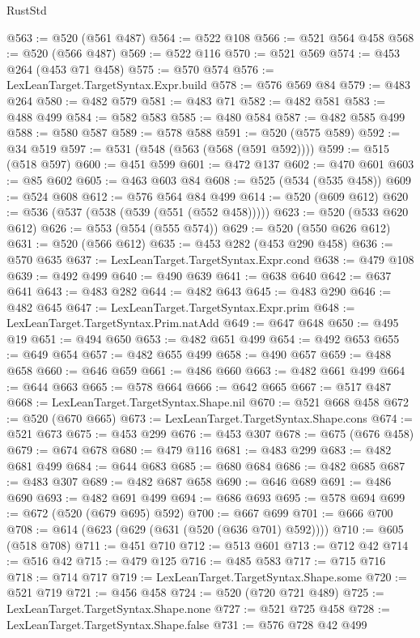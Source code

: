 \begin{lexlean}{RustStd}
\begin{coremodule}
{\begin{coremodule}
{{{{{{{{{{@563 := @520 (@561 @487)
@564 := @522 @108
@566 := @521 @564 @458
@568 := @520 (@566 @487)
@569 := @522 @116
@570 := @521 @569
@574 := @453 @264 (@453 @71 @458)
@575 := @570 @574
@576 := LexLeanTarget.TargetSyntax.Expr.build
@578 := @576 @569 @84
@579 := @483 @264
@580 := @482 @579
@581 := @483 @71
@582 := @482 @581
@583 := @488 @499
@584 := @582 @583
@585 := @480 @584
@587 := @482 @585 @499
@588 := @580 @587
@589 := @578 @588
@591 := @520 (@575 @589)
@592 := @34 @519
@597 := @531 (@548 (@563 (@568 (@591 @592))))
@599 := @515 (@518 @597)
@600 := @451 @599
@601 := @472 @137
@602 := @470 @601
@603 := @85 @602
@605 := @463 @603 @84
@608 := @525 (@534 (@535 @458))
@609 := @524 @608
@612 := @576 @564 @84 @499
@614 := @520 (@609 @612)
@620 := @536 (@537 (@538 (@539 (@551 (@552 @458)))))
@623 := @520 (@533 @620 @612)
@626 := @553 (@554 (@555 @574))
@629 := @520 (@550 @626 @612)
@631 := @520 (@566 @612)
@635 := @453 @282 (@453 @290 @458)
@636 := @570 @635
@637 := LexLeanTarget.TargetSyntax.Expr.cond
@638 := @479 @108
@639 := @492 @499
@640 := @490 @639
@641 := @638 @640
@642 := @637 @641
@643 := @483 @282
@644 := @482 @643
@645 := @483 @290
@646 := @482 @645
@647 := LexLeanTarget.TargetSyntax.Expr.prim
@648 := LexLeanTarget.TargetSyntax.Prim.natAdd
@649 := @647 @648
@650 := @495 @19
@651 := @494 @650
@653 := @482 @651 @499
@654 := @492 @653
@655 := @649 @654
@657 := @482 @655 @499
@658 := @490 @657
@659 := @488 @658
@660 := @646 @659
@661 := @486 @660
@663 := @482 @661 @499
@664 := @644 @663
@665 := @578 @664
@666 := @642 @665
@667 := @517 @487
@668 := LexLeanTarget.TargetSyntax.Shape.nil
@670 := @521 @668 @458
@672 := @520 (@670 @665)
@673 := LexLeanTarget.TargetSyntax.Shape.cons
@674 := @521 @673
@675 := @453 @299
@676 := @453 @307
@678 := @675 (@676 @458)
@679 := @674 @678
@680 := @479 @116
@681 := @483 @299
@683 := @482 @681 @499
@684 := @644 @683
@685 := @680 @684
@686 := @482 @685
@687 := @483 @307
@689 := @482 @687 @658
@690 := @646 @689
@691 := @486 @690
@693 := @482 @691 @499
@694 := @686 @693
@695 := @578 @694
@699 := @672 (@520 (@679 @695) @592)
@700 := @667 @699
@701 := @666 @700
@708 := @614 (@623 (@629 (@631 (@520 (@636 @701) @592))))
@710 := @605 (@518 @708)
@711 := @451 @710
@712 := @513 @601
@713 := @712 @42
@714 := @516 @42
@715 := @479 @125
@716 := @485 @583
@717 := @715 @716
@718 := @714 @717
@719 := LexLeanTarget.TargetSyntax.Shape.some
@720 := @521 @719
@721 := @456 @458
@724 := @520 (@720 @721 @489)
@725 := LexLeanTarget.TargetSyntax.Shape.none
@727 := @521 @725 @458
@728 := LexLeanTarget.TargetSyntax.Shape.false
@731 := @576 @728 @42 @499
}}}}}}}}}}
\end{coremodule}}
\end{coremodule}
\end{lexlean}
